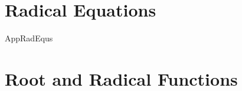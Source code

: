 \section{Radical Equations}

{AppRadEqus}

\section{Root and Radical Functions}





\newpage

\begin{comment}

\section{Power Functions}



\newpage


\section{Equations and Inequalities involving Power Functions}



\newpage
\end{comment}
